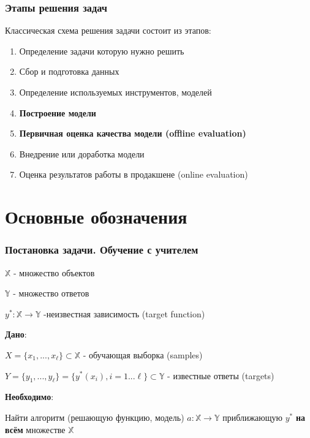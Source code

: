 \documentclass{beamer}
\begin{document}
	
	\begin{frame}
		\frametitle{Этапы решения задач}
		Классическая схема решения задачи состоит из этапов:
		\begin{enumerate}
			\item Определение задачи которую нужно решить
			\item Сбор и подготовка данных
			\item Определение используемых инструментов, моделей
			\item \textbf{Построение модели}
			\item \textbf{Первичная оценка качества модели (offline evaluation)}
			\item Внедрение или доработка модели
			\item Оценка результатов работы в продакшене (online evaluation)
			
		\end{enumerate}
		
	\end{frame}
	
	
	\section{Основные обозначения}
	
	
	\begin{frame}
		\frametitle{Постановка задачи. Обучение с учителем}
		
		$\mathbb{X}$ - множество объектов
		
		$\mathbb{Y}$ - множество ответов
		
		$y^{*}: \mathbb{X} \to \mathbb{Y}$ -неизвестная зависимость (target function)
		
		\vspace{15}
		
		\textbf{Дано}:
		
		$X = \{x_1, ..., x_\ell\} \subset \mathbb{X}$ - обучающая выборка (samples)
		
		$Y = \{y_1, ..., y_{\ell}\} = \{y^{*}(x_i), i = 1...\ell \} \subset \mathbb{Y}$ - известные ответы (targets)
		
		\vspace{5}
		
		\textbf{Необходимо}:
		
		Найти алгоритм (решающую функцию, модель) $a: \mathbb{X} \to \mathbb{Y}$ приближающую $y^{*}$ \textbf{на всём} множестве $\mathbb{X}$		
	\end{frame}
\end{document}
